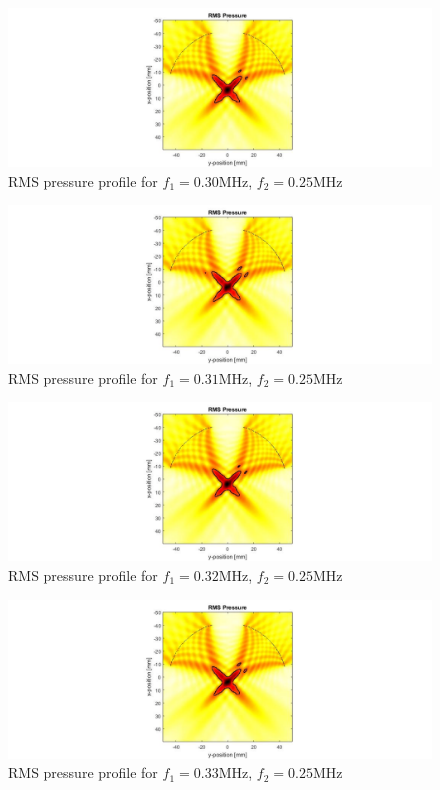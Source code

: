 \documentclass[10pt,a4paper]{article}
\begin{document}
\begin{figure}[!h]\label{f300kHz}
\hspace*{-5cm}                                                    
\includegraphics[scale=0.6]{f300kHz}
\caption{RMS pressure profile for $f_1 = 0.30$MHz, $f_2 = 0.25$MHz}
\end{figure}
\begin{figure}[!h]\label{f310kHz}
\hspace*{-5cm}                                                    
\includegraphics[scale=0.6]{f310kHz}
\caption{RMS pressure profile for $f_1 = 0.31$MHz, $f_2 = 0.25$MHz}
\end{figure}
\begin{figure}[!h]\label{f320kHz}
\hspace*{-5cm}                                                    
\includegraphics[scale=0.6]{f320kHz}
\caption{RMS pressure profile for $f_1 = 0.32$MHz, $f_2 = 0.25$MHz}
\end{figure}
\begin{figure}[!h]\label{f330kHz}
\hspace*{-5cm}                                                    
\includegraphics[scale=0.6]{f330kHz}
\caption{RMS pressure profile for $f_1 = 0.33$MHz, $f_2 = 0.25$MHz}
\end{figure}
\end{document}

